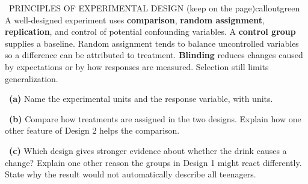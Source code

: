 \documentclass[11pt]{article}
\begin{document}
\begin{callout}{\IconBook\ PRINCIPLES OF EXPERIMENTAL DESIGN (keep on the page)}{calloutgreen}
A well-designed experiment uses \textbf{comparison}, \textbf{random assignment}, \textbf{replication}, and
control of potential confounding variables. A \textbf{control group} supplies a baseline. Random assignment
tends to balance uncontrolled variables so a difference can be attributed to treatment. \textbf{Blinding}
reduces changes caused by expectations or by how responses are measured. Selection still limits generalization.
\end{callout}

~\textbf{(a)} Name the experimental units and the response variable, with units.\par
{}

~\textbf{(b)} Compare how treatments are assigned in the two designs. Explain how one other feature of Design 2 helps the comparison.\par
{}

~\textbf{(c)} Which design gives stronger evidence about whether the drink causes a change? Explain one other reason the groups in Design 1 might react differently. State why the result would not automatically describe all teenagers.\par
{}
\end{document}
